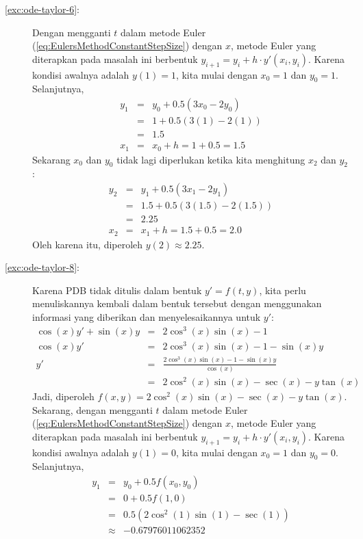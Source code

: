 \begin{description}
\item [{\ref{exc:ode-taylor-6}:}] Dengan mengganti $t$ dalam metode Euler
(\ref{eq:EulersMethodConstantStepSize}) dengan $x$, metode Euler
yang diterapkan pada masalah ini berbentuk $y_{i+1}=y_{i}+h\cdot y'(x_{i},y_{i})$.
Karena kondisi awalnya adalah $y(1)=1$, kita mulai dengan $x_{0}=1$
dan $y_{0}=1$. Selanjutnya, 
\begin{eqnarray*}
y_{1} & = & y_{0}+0.5(3x_{0}-2y_{0})\\
 & = & 1+0.5(3(1)-2(1))\\
 & = & 1.5\\
x_{1} & = & x_{0}+h=1+0.5=1.5
\end{eqnarray*}
Sekarang $x_{0}$ dan $y_{0}$ tidak lagi diperlukan ketika kita menghitung
$x_{2}$ dan $y_{2}$:
\begin{eqnarray*}
y_{2} & = & y_{1}+0.5(3x_{1}-2y_{1})\\
 & = & 1.5+0.5(3(1.5)-2(1.5))\\
 & = & 2.25\\
x_{2} & = & x_{1}+h=1.5+0.5=2.0
\end{eqnarray*}
Oleh karena itu, diperoleh $y(2)\approx2.25$.
\item [{\ref{exc:ode-taylor-8}:}] Karena PDB tidak ditulis dalam bentuk
$y'=f(t,y)$, kita perlu menuliskannya kembali dalam bentuk tersebut
dengan menggunakan informasi yang diberikan dan menyelesaikannya untuk
$y'$:
\begin{eqnarray*}
\cos(x)y'+\sin(x)y & = & 2\cos^{3}(x)\sin(x)-1\\
\cos(x)y' & = & 2\cos^{3}(x)\sin(x)-1-\sin(x)y\\
y' & = & \frac{2\cos^{3}(x)\sin(x)-1-\sin(x)y}{\cos(x)}\\
 & = & 2\cos^{2}(x)\sin(x)-\sec(x)-y\tan(x)
\end{eqnarray*}
Jadi, diperoleh $f(x,y)=2\cos^{2}(x)\sin(x)-\sec(x)-y\tan(x)$. Sekarang,
dengan mengganti $t$ dalam metode Euler (\ref{eq:EulersMethodConstantStepSize})
dengan $x$, metode Euler yang diterapkan pada masalah ini berbentuk
$y_{i+1}=y_{i}+h\cdot y'(x_{i},y_{i})$. Karena kondisi awalnya adalah
$y(1)=0$, kita mulai dengan $x_{0}=1$ dan $y_{0}=0$. Selanjutnya,
\begin{eqnarray*}
y_{1} & = & y_{0}+0.5f(x_{0},y_{0})\\
 & = & 0+0.5f(1,0)\\
 & = & 0.5(2\cos^{2}(1)\sin(1)-\sec(1))\\
 & \approx & -0.67976011062352\\

\end{eqnarray*}
\end{description}
